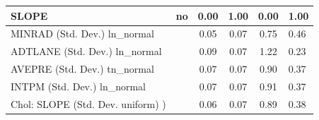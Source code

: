 \begin{table}
\begin{center}
\begin{tabular}{|l|l|c|c|c|l|}
			\hline
			SLOPE & no & 0.00 & 1.00 & 0.00 & 1.00 \\
			\hline
			MINRAD (Std. Dev.) ln_normal &  & 0.05 & 0.07 & 0.75 & 0.46 \\
			\hline
			ADTLANE (Std. Dev.) ln_normal &  & 0.09 & 0.07 & 1.22 & 0.23 \\
			\hline
			AVEPRE (Std. Dev.) tn_normal &  & 0.07 & 0.07 & 0.90 & 0.37 \\
			\hline
			INTPM (Std. Dev.) ln_normal &  & 0.07 & 0.07 & 0.91 & 0.37 \\
			\hline
			 Chol: SLOPE (Std. Dev. uniform) ) &  & 0.06 & 0.07 & 0.89 & 0.38 \\
			\hline
		\end{tabular}
	\end{center}
\end{table}